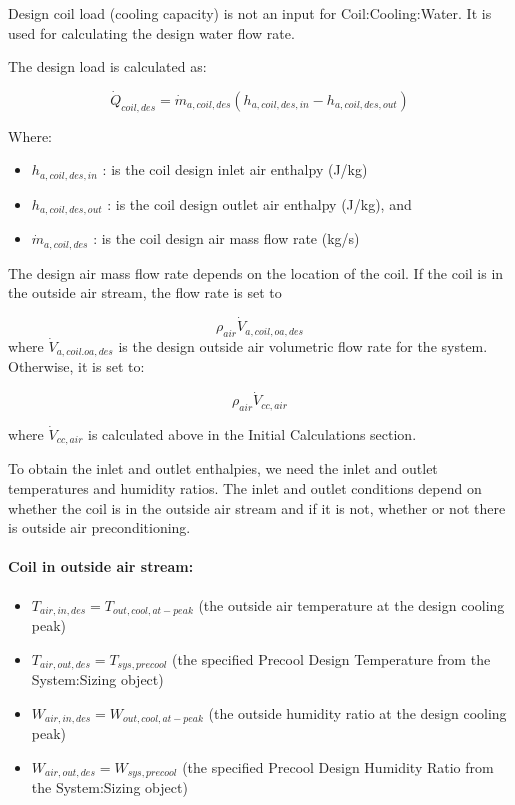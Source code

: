 Design coil load (cooling capacity) is not an input for Coil:Cooling:Water. It is used for calculating the design water flow rate.

The design load is calculated as:

\begin{equation}
\dot{Q}_{coil,des} = \dot{m}_{a,coil,des}\left(h_{a,coil,des,in}-h_{a,coil,des,out}\right)
\end{equation}

Where:

\begin{itemize}
\item
  \(h_{a,coil,des,in}\) : is the coil design inlet air enthalpy (J/kg)
\item
  \(h_{a,coil,des,out}\) : is the coil design outlet air enthalpy (J/kg), and
\item
  \(\dot{m}_{a,coil,des}\) : is the coil design air mass flow rate (kg/s)
\end{itemize}

The design air mass flow rate depends on the location of the coil. If the coil is in the outside air stream, the flow rate is set to

\[\rho_{air}\dot{V}_{a,coil,oa,des}\] where \(\dot{V}_{a,coil.oa,des}\) is the design outside air volumetric flow rate for the system. Otherwise, it is set to:

\begin{equation}
\rho_{air}\dot{V}_{cc,air}
\end{equation}

where \(\dot{V}_{cc,air}\) is calculated above in the Initial Calculations section.

To obtain the inlet and outlet enthalpies, we need the inlet and outlet temperatures and humidity ratios. The inlet and outlet conditions depend on whether the coil is in the outside air stream and if it is not, whether or not there is outside air preconditioning.

\paragraph{\texorpdfstring{\textbf{Coil in outside air stream}:}{Coil in outside air stream:}}\label{coil-in-outside-air-stream}

\begin{itemize}
\item
  \(T_{air,in,des} = T_{out,cool,at-peak}\) (the outside air temperature at the design cooling peak)
\item
  \(T_{air,out,des} = T_{sys,precool}\) (the specified Precool Design Temperature from the System:Sizing object)
\item
  \(W_{air,in,des} = W_{out,cool,at-peak}\) (the outside humidity ratio at the design cooling peak)
\item
  \(W_{air,out,des} = W_{sys,precool}\) (the specified Precool Design Humidity Ratio from the System:Sizing object)
\end{itemize}

